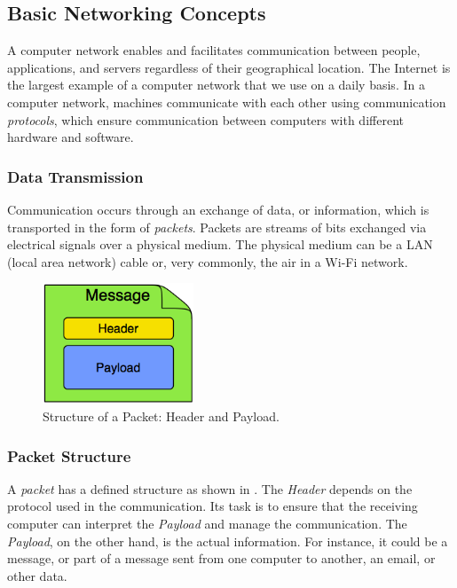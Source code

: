 \subsection{Basic Networking Concepts}

A computer network enables and facilitates communication between people, applications, and servers regardless of their geographical location. The Internet is the largest example of a computer network that we use on a daily basis. In a computer network, machines communicate with each other using communication \textit{protocols}, which ensure communication between computers with different hardware and software.

\subsubsection{Data Transmission}

Communication occurs through an exchange of data, or information, which is transported in the form of \textit{packets}. Packets are streams of bits exchanged via electrical signals over a physical medium. The physical medium can be a LAN (local area network) cable or, very commonly, the air in a Wi-Fi network.

\begin{figure}[h]
    \centering
    \includegraphics[width=0.4\textwidth]{images/message.png}
    \caption{Structure of a Packet: Header and Payload.}
    \label{fig:packet_structure}
\end{figure}

\subsubsection{Packet Structure}

A \textit{packet} has a defined structure as shown in . The \textit{Header} depends on the protocol used in the communication. Its task is to ensure that the receiving computer can interpret the \textit{Payload} and manage the communication. The \textit{Payload}, on the other hand, is the actual information. For instance, it could be a message, or part of a message sent from one computer to another, an email, or other data.

